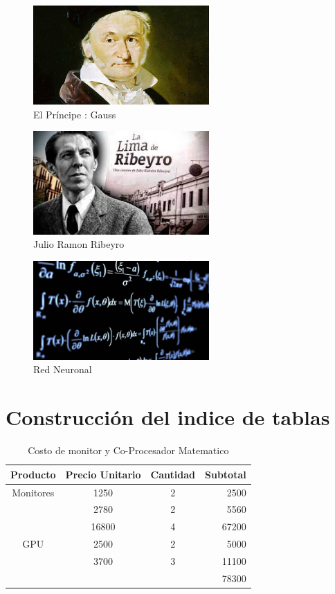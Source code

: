 \documentclass{article}
\begin{document}
\begin{figure}[h]
	\centering
	\includegraphics[width=0.6\textwidth]{Figuras/gausskl.jpg}
	\caption{El Príncipe : Gauss}
	\label{fig: gauss}
\end{figure}
\lipsum[3]

\begin{figure}[h]
	\centering
	\includegraphics[width=0.6\textwidth]{Figuras/descarga.jpg}
	\caption{Julio Ramon Ribeyro}
	\label{fig: Maestro}
\end{figure}

\lipsum[3-7]
\begin{figure}[h]
	\centering
	\includegraphics[width=0.6\textwidth]{Figuras/Data-science-without-mathematics.jpg}
	\caption{Red Neuronal}
	\label{fig: perceptron}
\end{figure}

\section{Construcción del indice de tablas}
\lipsum[15]
\begin{table}[h]
	\centering
	\begin{tabular}{cccr}
		\hline
		Producto & Precio Unitario & Cantidad & Subtotal \\
		\hline
		Monitores & 1250 & 2 & 2500\\
		& 2780 & 2 & 5560\\
		& 16800 & 4 & 67200\\
		\hline
		GPU		  & 2500 & 2 & 5000\\
		& 3700 & 3 & 11100\\
		\cline{4-4}
		&      &   & 78300
	\end{tabular}
\caption{Costo de monitor y Co-Procesador Matematico}
\label{table:1}
\end{table}
\end{document}

